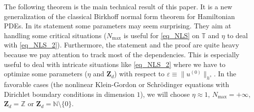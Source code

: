 \documentclass[JEP,XML,SOM,Unicode,NoEqCountersInSection,published]{cedram}
\theoremstyle{definition}
\begin{document}
\label{sec_BNF_LR}

The following theorem is the main technical result of this paper. It is a new generalization of the classical Birkhoff normal form theorem for Hamiltonian PDEs. In its statement some parameters may seem surprising. They aim at handling some critical situations ($N_{\max}$ is useful for \eqref{eq_NLS} on $\mathbb{T}$ and $\eta$ to deal with \eqref{eq_NLS_2}). Furthermore, the statement and the proof are quite heavy because we pay attention to track most of the dependencies. This is especially useful to deal with intricate situations like \eqref{eq_NLS_2} where we have to optimize some parameters ($\eta$ and $\mathbf{Z}_d$) with respect to $\varepsilon \equiv \|u^{(0)} \|_{h^s}$. In the favorable cases (\eg the nonlinear Klein-Gordon or Schrödinger equations with Dirichlet boundary conditions in dimension $1$), we will choose $\eta\approx 1$, $N_{\max}=+\infty$, $\mathbf{Z}_d = \mathbb{Z}$ or $\mathbf{Z}_d = \mathbb{N}\setminus \{0\}$.
\end{document}
